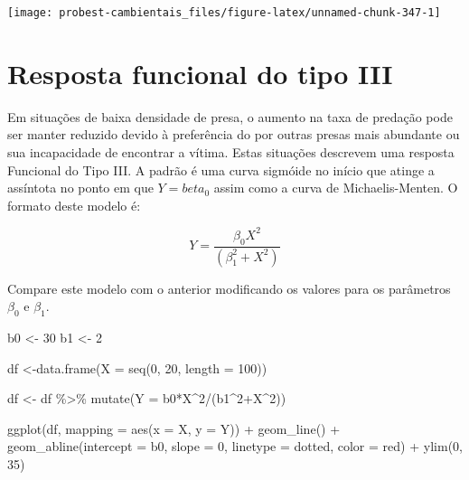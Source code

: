 \documentclass[
]{book}
\newenvironment{Shaded}{\begin{snugshade}}{\end{snugshade}}
\newcommand{\AttributeTok}[1]{\textcolor[rgb]{0.77,0.63,0.00}{#1}}
\newcommand{\DecValTok}[1]{\textcolor[rgb]{0.00,0.00,0.81}{#1}}
\newcommand{\FunctionTok}[1]{\textcolor[rgb]{0.00,0.00,0.00}{#1}}
\newcommand{\NormalTok}[1]{#1}
\newcommand{\OtherTok}[1]{\textcolor[rgb]{0.56,0.35,0.01}{#1}}
\newcommand{\SpecialCharTok}[1]{\textcolor[rgb]{0.00,0.00,0.00}{#1}}
\newcommand{\StringTok}[1]{\textcolor[rgb]{0.31,0.60,0.02}{#1}}
\begin{document}
\begin{center}\texttt{[image: probest-cambientais\_files/figure-latex/unnamed-chunk-347-1]} \end{center}

\hypertarget{resposta-funcional-do-tipo-iii}{%
\section{Resposta funcional do tipo III}\label{resposta-funcional-do-tipo-iii}}

Em situações de baixa densidade de presa, o aumento na taxa de predação pode ser manter reduzido devido à preferência do por outras presas mais abundante ou sua incapacidade de encontrar a vítima. Estas situações descrevem uma resposta Funcional do Tipo III. A padrão é uma curva sigmóide no início que atinge a assíntota no ponto em que \(Y = beta_0\) assim como a curva de Michaelis-Menten. O formato deste modelo é:

\[Y = \frac{\beta_0 X^2}{(\beta_1^2 + X^2)}\]

Compare este modelo com o anterior modificando os valores para os parâmetros \(\beta_0\) e \(\beta_1\).

\begin{Shaded}
\begin{Highlighting}[]
\NormalTok{b0 }\OtherTok{\textless{}{-}} \DecValTok{30}
\NormalTok{b1 }\OtherTok{\textless{}{-}} \DecValTok{2}

\NormalTok{df }\OtherTok{\textless{}{-}}\FunctionTok{data.frame}\NormalTok{(}\AttributeTok{X =} \FunctionTok{seq}\NormalTok{(}\DecValTok{0}\NormalTok{, }\DecValTok{20}\NormalTok{, }\AttributeTok{length =} \DecValTok{100}\NormalTok{))}

\NormalTok{df }\OtherTok{\textless{}{-}}\NormalTok{ df }\SpecialCharTok{\%\textgreater{}\%} \FunctionTok{mutate}\NormalTok{(}\AttributeTok{Y =}\NormalTok{ b0}\SpecialCharTok{*}\NormalTok{X}\SpecialCharTok{\^{}}\DecValTok{2}\SpecialCharTok{/}\NormalTok{(b1}\SpecialCharTok{\^{}}\DecValTok{2}\SpecialCharTok{+}\NormalTok{X}\SpecialCharTok{\^{}}\DecValTok{2}\NormalTok{))}

\FunctionTok{ggplot}\NormalTok{(df, }\AttributeTok{mapping =} \FunctionTok{aes}\NormalTok{(}\AttributeTok{x =}\NormalTok{ X, }\AttributeTok{y =}\NormalTok{ Y)) }\SpecialCharTok{+}
  \FunctionTok{geom\_line}\NormalTok{() }\SpecialCharTok{+}
  \FunctionTok{geom\_abline}\NormalTok{(}\AttributeTok{intercept =}\NormalTok{ b0, }\AttributeTok{slope =} \DecValTok{0}\NormalTok{, }\AttributeTok{linetype =} \StringTok{\textquotesingle{}dotted\textquotesingle{}}\NormalTok{, }\AttributeTok{color =} \StringTok{\textquotesingle{}red\textquotesingle{}}\NormalTok{) }\SpecialCharTok{+}
  \FunctionTok{ylim}\NormalTok{(}\DecValTok{0}\NormalTok{, }\DecValTok{35}\NormalTok{)}
\end{Highlighting}
\end{Shaded}
\end{document}
